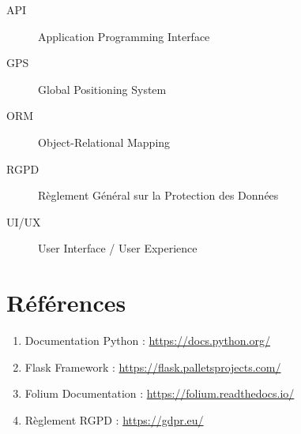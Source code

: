 \documentclass[12pt,a4paper]{article}
\begin{document}
\begin{description}
    \item[API] Application Programming Interface
    \item[GPS] Global Positioning System
    \item[ORM] Object-Relational Mapping
    \item[RGPD] Règlement Général sur la Protection des Données
    \item[UI/UX] User Interface / User Experience
\end{description}

\section{Références}

\begin{enumerate}
    \item Documentation Python : \url{https://docs.python.org/}
    \item Flask Framework : \url{https://flask.palletsprojects.com/}
    \item Folium Documentation : \url{https://folium.readthedocs.io/}
    \item Règlement RGPD : \url{https://gdpr.eu/}
\end{enumerate}
\end{document}
